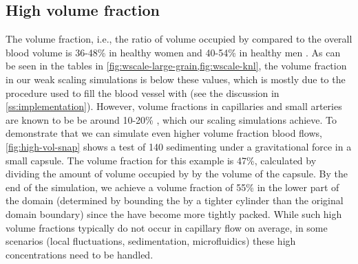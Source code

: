 \begin{figure}[!htb]
  \centering
  \vspace{-5pt}
\end{figure}%
\subsection{High volume fraction}
The \rbc volume fraction, i.e., the ratio of volume occupied by \rbcs
compared to the overall blood volume is 36-48\% in healthy women and
40-54\% in healthy men \cite{billett1990hemoglobin}. As can be seen in the tables in
\cref{fig:wscale-large-grain,fig:wscale-knl}, the volume fraction in
our weak scaling simulations is below these values, which is mostly due to
the procedure used to fill the blood vessel with \rbcs (see the
discussion in \cref{ss:implementation}).
However, \rbc volume fractions in capillaries and small arteries are
known to be be around 10-20\%
\cite{wang2013simulation,saadat2019simulation}, which our scaling
simulations achieve.
To demonstrate that we can simulate even higher volume fraction blood flows,
\cref{fig:high-vol-snap} shows a test of 140 \rbcs sedimenting under a
gravitational force in a small capsule. The volume fraction for this example is
47\%, calculated by dividing the amount of volume occupied by \rbcs by the
volume of the capsule.
By the end of the simulation, we achieve a volume fraction
of 55\% in the lower part of the domain (determined by bounding the
\rbcs by a tighter cylinder than the original domain boundary) since
the \rbcs have become more tightly packed.
While such high volume fractions typically do not occur in capillary flow on average, in some scenarios (local fluctuations, sedimentation, microfluidics) these high concentrations need to be handled. 


